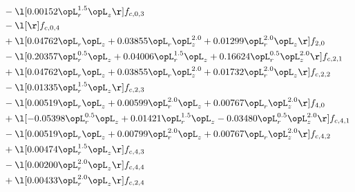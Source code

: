 \begin{alignat}{2}
& - \l[  0.00152 \opL_r^{1.5} \opL_z  \r] f_{c,0,3} \nonumber \\ 
& - \l[  \r] f_{c,0,4} \nonumber \\ 
& + \l[  0.04762 \opL_r \opL_z +  0.03855 \opL_r \opL_z^{2.0} +  0.01299 \opL_r^{2.0} \opL_z  \r] f_{2,0} \nonumber \\ 
& - \l[  0.20357 \opL_r^{0.5} \opL_z +  0.04006 \opL_r^{1.5} \opL_z +  0.16624 \opL_r^{0.5} \opL_z^{2.0}  \r] f_{c,2,1} \nonumber \\ 
& + \l[  0.04762 \opL_r \opL_z +  0.03855 \opL_r \opL_z^{2.0} +  0.01732 \opL_r^{2.0} \opL_z  \r] f_{c,2,2} \nonumber \\ 
& - \l[  0.01335 \opL_r^{1.5} \opL_z  \r] f_{c,2,3} \nonumber \\ 
& - \l[  0.00519 \opL_r \opL_z +  0.00599 \opL_r^{2.0} \opL_z +  0.00767 \opL_r \opL_z^{2.0}  \r] f_{4,0} \nonumber \\ 
& + \l[  -0.05398 \opL_r^{0.5} \opL_z +  0.01421 \opL_r^{1.5} \opL_z   -0.03480 \opL_r^{0.5} \opL_z^{2.0}  \r] f_{c,4,1} \nonumber \\ 
& - \l[  0.00519 \opL_r \opL_z +  0.00799 \opL_r^{2.0} \opL_z +  0.00767 \opL_r \opL_z^{2.0}  \r] f_{c,4,2} \nonumber \\ 
& + \l[  0.00474 \opL_r^{1.5} \opL_z  \r] f_{c,4,3} \nonumber \\ 
& - \l[  0.00200 \opL_r^{2.0} \opL_z  \r] f_{c,4,4} \nonumber \\ 
& + \l[  0.00433 \opL_r^{2.0} \opL_z  \r] f_{c,2,4} \nonumber \\ 
\end{alignat} 


